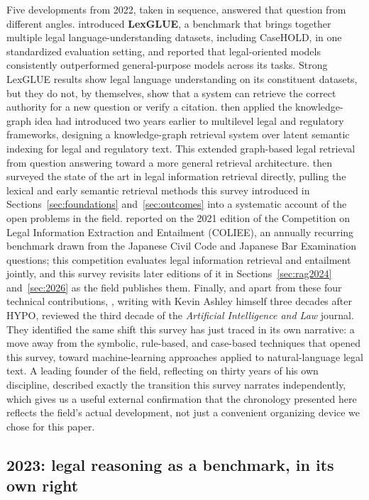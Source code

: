 Five developments from 2022, taken in sequence, answered that question from different angles.
\citet{chalkidis2022} introduced \textbf{LexGLUE}, a benchmark that brings together multiple legal
language-understanding datasets, including CaseHOLD, in one standardized evaluation setting, and
reported that legal-oriented models consistently outperformed general-purpose models across its
tasks. Strong LexGLUE results show legal language understanding on its constituent datasets, but
they do not, by themselves, show that a system can retrieve the correct authority for a new question
or verify a citation. \citet{zhu2022} then applied the knowledge-graph idea \citet{sovrano2020} had
introduced two years earlier to multilevel legal and regulatory frameworks, designing a
knowledge-graph retrieval system over latent semantic indexing for legal and regulatory text. This
extended graph-based legal retrieval from question answering toward a more general retrieval
architecture. \citet{sansone2022} then surveyed the state of the art in legal information retrieval
directly, pulling the lexical and early semantic retrieval methods this survey introduced in
Sections~\ref{sec:foundations} and~\ref{sec:outcomes} into a systematic account of the open problems in the field. \citet{rabelo2022}
reported on the 2021 edition of the Competition on Legal Information Extraction and Entailment
(COLIEE), an annually recurring benchmark drawn from the Japanese Civil Code and Japanese Bar
Examination questions; this competition evaluates legal information retrieval and entailment
jointly, and this survey revisits later editions of it in Sections~\ref{sec:rag2024} and~\ref{sec:2026}
as the field publishes them. Finally, and apart from these four technical contributions,
\citet{villata2022}, writing with Kevin Ashley himself three decades after HYPO, reviewed the third
decade of the \emph{Artificial Intelligence and Law} journal. They identified the same shift this
survey has just traced in its own narrative: a move away from the symbolic, rule-based, and
case-based techniques that opened this survey, toward machine-learning approaches applied to
natural-language legal text. A leading founder of the field, reflecting on thirty years of his own
discipline, described exactly the transition this survey narrates independently, which gives us a
useful external confirmation that the chronology presented here reflects the field's actual
development, not just a convenient organizing device we chose for this paper.

\subsection{2023: legal reasoning as a benchmark, in its own right}

